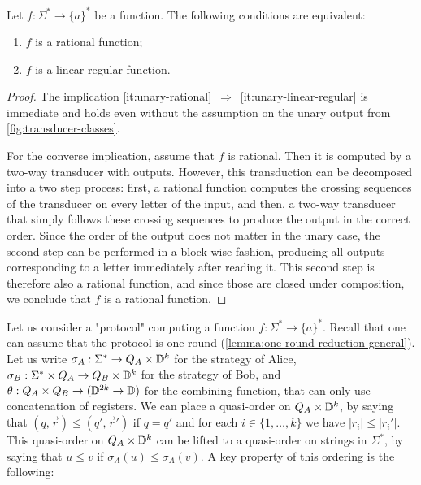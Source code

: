 \begin{lemma}
  \label{lem:unary-linear-regular-rational}
  Let $f : \Sigma^* \to \{a\}^*$ be a function. The following conditions are
  equivalent:
  \begin{enumerate}
    \item \label{it:unary-rational}
      $f$ is a rational function;
    \item \label{it:unary-linear-regular}
        $f$ is a linear regular function.
  \end{enumerate}
\end{lemma}
\begin{proof}
  The implication \ref{it:unary-rational}~$\Rightarrow$~\ref{it:unary-linear-regular}
  is immediate  and holds even without the assumption on the 
  unary output from \cref{fig:transducer-classes}.

  For the converse implication, assume that $f$ is rational. Then it is
  computed by a two-way transducer with outputs. However, this transduction can
  be decomposed into a two step process: first, a rational function computes
  the crossing sequences of the transducer on every letter of the input, and
  then, a two-way transducer that simply follows these crossing sequences to
  produce the output in the correct order. Since the order of the output does
  not matter in the unary case, the second step can be performed in a
  block-wise fashion, producing all outputs corresponding to a letter
  immediately after reading it. This second step is therefore also a rational
  function, and since those are closed under composition, we conclude that $f$ is
  a rational function.
\end{proof}

Let us consider a "protocol" computing a function $f : \Sigma^* \to \{a\}^*$.
Recall that one can assume that the protocol is one round
(\cref{lemma:one-round-reduction-general}). Let us write $\sigma_A : \Sigma^*
\to Q_A \times \mathbb D^k$ for the strategy of Alice, $\sigma_B : \Sigma^*
\times Q_A \to Q_B \times \mathbb D^k$ for the strategy of Bob, and $\theta : Q_A
\times Q_B \to (\mathbb D^{2k} \to \mathbb D)$ for the combining function, that can
only use concatenation of registers. We can place a quasi-order on $Q_A \times
\mathbb D^k$, by saying that $(q, \vec{r}) \leq (q', \vec{r}')$ if $q = q'$ and
for each $i \in \{1, \ldots, k\}$ we have $|r_i|\leq |r_i'|$. This quasi-order
on $Q_A \times \mathbb D^k$ can be lifted to a quasi-order on strings in
$\Sigma^*$, by saying that $u \leq v$ if $\sigma_A(u) \leq \sigma_A(v)$. A key
property of this ordering is the following:

